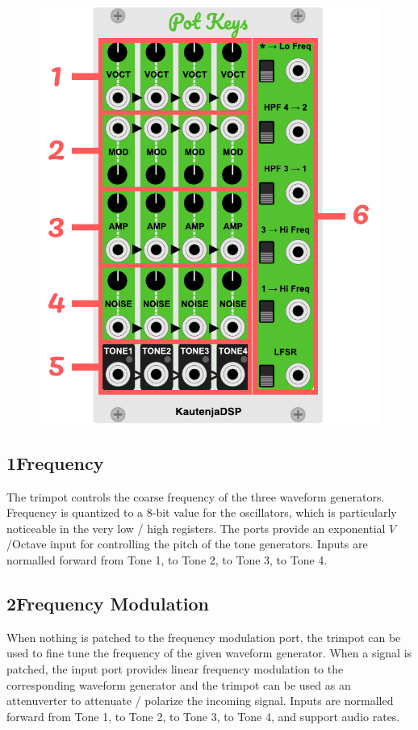 \documentclass[12pt,letter]{article}
\begin{document}
\begin{figure}[!htp]
\centering
\includegraphics{Interface}
\end{figure}

\subsection*{1{\quad}Frequency}

The trimpot controls the coarse frequency of the three waveform generators. Frequency is quantized to a 8-bit value for the oscillators, which is particularly noticeable in the very low / high registers. The ports provide an exponential $V$/Octave input for controlling the pitch of the tone generators. Inputs are normalled forward from Tone 1, to Tone 2, to Tone 3, to Tone 4.

\subsection*{2{\quad}Frequency Modulation}

When nothing is patched to the frequency modulation port, the trimpot can be used to fine tune the frequency of the given waveform generator. When a signal is patched, the input port provides linear frequency modulation to the corresponding waveform generator and the trimpot can be used as an attenuverter to attenuate / polarize the incoming signal. Inputs are normalled forward from Tone 1, to Tone 2, to Tone 3, to Tone 4, and support audio rates.
\end{document}
